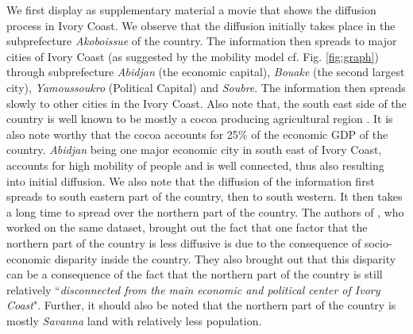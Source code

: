 \documentclass[review]{elsarticle}
\begin{document}
We first display as supplementary material a movie \cite{Agarwal2013aa} that shows the diffusion process in Ivory Coast. We observe that the diffusion initially takes place in the subprefecture \emph{Akoboissue} of the country. The information then spreads to major cities of Ivory Coast (as suggested by the mobility model cf. Fig. \ref{fig:graph}) through subprefecture \emph{Abidjan} (the economic capital), \emph{Bouake} (the second largest city), \emph{Yamoussoukro} (Political Capital) and \emph{Soubre}. The information then spreads slowly to other cities in the Ivory Coast. Also note that, the south east side of the country is well known to be mostly a cocoa producing agricultural region \cite{Web2}. It is also note worthy that the cocoa accounts for 25\% of the economic GDP of the country. \emph{Abidjan} being one major economic city in south east of Ivory Coast, accounts for high mobility of people and is well connected, thus also resulting into initial diffusion. We also note that the diffusion of the information first spreads to south eastern part of the country, then to south western. It then takes a long time to spread over the northern part of the country. The authors of \cite{Clio2013}, who worked on the same dataset, brought out the fact that one factor that the northern part of the country is less diffusive is due to the consequence of socio-economic disparity inside the country. They also brought out that this disparity can be a consequence of the fact that the northern part of the country is still relatively ``\textit{disconnected from the main economic and political center of Ivory Coast}". Further, it should also be noted that the northern part of the country is mostly \emph{Savanna} land with relatively less population.
\end{document}
